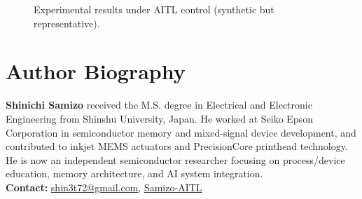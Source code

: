 \documentclass[conference]{IEEEtran}
\begin{document}
\begin{figure*}[!b]

  \caption{Experimental results under AITL control (synthetic but representative).}
  \label{fig:results}
\end{figure*}

\section*{Author Biography}
\noindent\textbf{Shinichi Samizo}
received the M.S. degree in Electrical and Electronic Engineering from Shinshu University, Japan.
He worked at Seiko Epson Corporation in semiconductor memory and mixed-signal device development, and contributed to inkjet MEMS actuators and PrecisionCore printhead technology.
He is now an independent semiconductor researcher focusing on process/device education, memory architecture, and AI system integration.\\[2pt]
\textbf{Contact:} \href{mailto:shin3t72@gmail.com}{shin3t72@gmail.com},
\href{https://github.com/Samizo-AITL}{Samizo-AITL}
\end{document}
